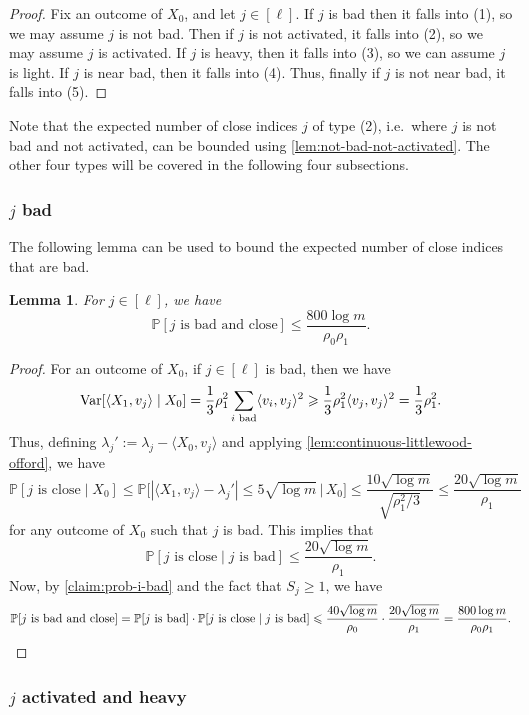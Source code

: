 \documentclass[reqno]{amsart}
\newtheorem{lemma}[theorem]{Lemma}
\theoremstyle{remark}
\theoremstyle{definition}
\numberwithin{theorem}{section}
\renewcommand{\(}{\bigl(}
\renewcommand{\)}{\bigr)\vphantom{)}}
\renewcommand{\le}{\leqslant}
\renewcommand{\ge}{\geqslant}
\renewcommand{\P}{\mathbb{P}}
\newcommand{\ang}[1]{\langle#1\rangle}
\newcommand{\var}{\textup{Var}}
\begin{document}
\begin{proof}
    Fix an outcome of $X_0$, and let $j\in [\ell]$. If $j$ is bad then it falls into (1), so we may assume $j$ is not bad. Then if $j$ is not activated, it falls into (2), so we may assume $j$ is activated. If $j$ is heavy, then it falls into (3), so we can assume $j$ is light. If $j$ is near bad, then it falls into (4). Thus, finally if $j$ is not near bad, it falls into (5).
\end{proof}

Note that the expected number of close indices $j$ of type (2), i.e.\ where $j$ is not bad and not activated, can be bounded using \cref{lem:not-bad-not-activated}. The other four types will be covered in the following four subsections.

\subsubsection{$j$ bad}

The following lemma can be used to bound the expected number of close indices that are bad.

\begin{lemma}\label{lem:prob-bad-close}
    For $j\in [\ell]$, we have 
    \[\P[j \text{ is bad and close}]\le \frac{800\log m}{\rho_0\rho_1}.\]
\end{lemma}

\begin{proof}
    For an outcome of $X_0$, if $j\in [\ell]$ is bad, then we have 
    \[\var[\ang{X_1,v_j}\mid X_0] = \frac{1}{3}\rho_1^2\sum_{i\text{ bad}}\ang{v_i,v_j}^2\ge \frac{1}{3}\rho_1^2\ang{v_j,v_j}^2=\frac{1}{3}\rho_1^2.\]
    Thus, defining $\lambda_j' := \lambda_j - \ang{X_0,v_j}$ and applying \cref{lem:continuous-littlewood-offord}, we have 
    \[\P[j\text{ is close}\mid X_0] \le \P\Big[|\ang{X_1,v_j} - \lambda_j'|\le 5\sqrt{\log m}\,\Big|\, X_0\Big]\le \frac{10\sqrt{\log m}}{\sqrt{\rho_1^2/3}}\le \frac{20\sqrt{\log m}}{\rho_1}\]
    for any outcome of $X_0$ such that $j$ is bad. This implies that
    \[\P[j\text{ is close}\mid j\text{ is bad}] \le  \frac{20\sqrt{\log m}}{\rho_1}.\]
    Now, by \cref{claim:prob-i-bad} and the fact that $S_j\ge 1$, we have
    \[\P[j \text{ is bad and close}] = \P[j\text{ is bad}]\cdot \P[j\text{ is close}\mid j\text{ is bad}]\le \frac{40\sqrt{\log m}}{\rho_0}\cdot \frac{20\sqrt{\log m}}{\rho_1} = \frac{800\log m}{\rho_0\rho_1}.\qedhere\]
\end{proof}


\subsubsection{$j$ activated and heavy}
\end{document}
